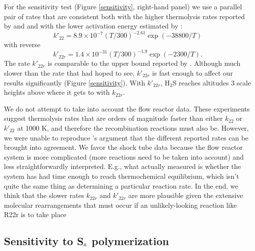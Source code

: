 \documentclass[preprint]{aastex6}
\newcounter{reaction}
\begin{document}
For the sensitivity test (Figure \ref{sensitivity}, right-hand panel) we use a parallel pair of rates that are consistent 
both with the higher thermolysis rates reported by \citet{Olschewski1994} and \citet{Woiki1994}
and with the lower activation energy estimated by \citet{Olschewski1994}:
\begin{equation}
\label{kprime22}
k'_{22} = 8.9\times 10^{-7} \left(T/300\right)^{-2.61} \exp{\left(-38800/T\right)} 
\end{equation}   
with reverse  
\begin{equation}
\label{kprime22r}
k'_{22r} = 1.4\times 10^{-31} \left(T/300\right)^{-1.9} \exp{\left(-2300/T\right)} .
\end{equation}   
The rate $k'_{22r}$ is comparable to the upper bound reported by \citet{Shiina1998}.
Although much slower than the rate that \citet{Shiina1998} had hoped to see,
$k'_{22r}$ is fast enough to affect our results significantly (Figure \ref{sensitivity}). 
With $k'_{22r}$, H$_2$S reaches altitudes 3 scale heights above where it gets to with $k_{22r}$. 

We do not attempt to take into account the flow reactor data.
These experiments suggest thermolysis rates that are orders of magnitude faster than either $k_{22}$ or $k'_{22}$ at 1000 K,
and therefore the recombination reactions must also be.
However, we were unable to reproduce \citet{Karan1999}'s argument that the different reported rates can be brought into agreement.
We favor the shock tube data because the flow reactor system is more complicated (more reactions need to be taken into account)
and less straightforwardly interpreted.
E.g., what \citet{Karan1999} actually measured is whether the system has had time enough to reach thermochemical equilibrium,
which isn't quite the same thing as determining a particular reaction rate.
In the end, we think that the slower rates $k_{22r}$ and $k'_{22r}$ are more plausible given the extensive
molecular rearrangements that must occur if an unlikely-looking reaction like R22r
is to take place


\subsection{Sensitivity to S$_{\rm n}$ polymerization}
\end{document}
